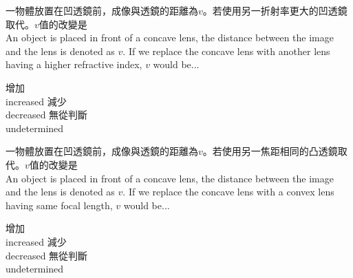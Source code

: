 \documentclass[beamer=true]{standalone}
\begin{document}
\begin{eg}
    一物體放置在凹透鏡前，成像與透鏡的距離為$v$。若使用另一折射率更大的凹透鏡取代。$v$值的改變是\\
    An object is placed in front of a concave lens, the distance between the image and the lens is denoted as $v$. If we replace the concave lens with another lens having a higher refractive index, $v$ would be...
    \begin{statements}
        \task 增加\\increased
        \task 減少\\decreased
        \task 無從判斷\\undetermined
    \end{statements}
\end{eg}

\begin{eg}
    一物體放置在凹透鏡前，成像與透鏡的距離為$v$。若使用另一焦距相同的凸透鏡取代。$v$值的改變是\\
    An object is placed in front of a concave lens, the distance between the image and the lens is denoted as $v$. If we replace the concave lens with a convex lens having same focal length, $v$ would be...
    \begin{statements}
        \task 增加\\increased
        \task 減少\\decreased
        \task 無從判斷\\undetermined
    \end{statements}
\end{eg}
\end{document}
